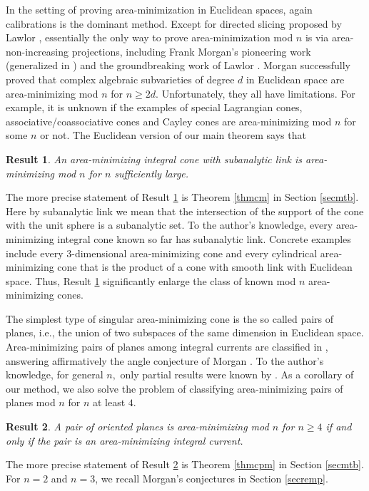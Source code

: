 \documentclass[11pt,a4paper]{amsart}
\numberwithin{equation}{section}
\theoremstyle{plain}
\newtheorem{rst}{Result}
\theoremstyle{definition}
\numberwithin{equation}{subsection}
\begin{document}
In the setting of proving area-minimization in Euclidean spaces, again calibrations is the dominant method. Except for directed slicing proposed by Lawlor \cite{GLds,GLsac}, essentially the only way to prove area-minimization mod $n$ is via area-non-increasing projections, including Frank Morgan's pioneering work \cite{FMcalv} (generalized in \cite[Lemma 2.11]{ZLa}) and the groundbreaking work of Lawlor \cite{GL}. Morgan \cite{FMcalv} successfully proved that complex algebraic subvarieties of degree $d$ in Euclidean space are area-minimizing mod $n$ for $n\ge 2d.$  Unfortunately, they all have limitations. For example, it is unknown \cite[Proposition 5.6]{FMcalv} if the examples \cite{HL} of special Lagrangian \cite{MHsc,MHsc2,DJsl,YZsmp,RBssl} cones, associative/coassociative \cite{RBas} cones and Cayley \cite{JLa,JL2r} cones are area-minimizing mod $n$ for some $n$ or not. The Euclidean version of our main theorem says that
\begin{rst}\label{rstc}
	An area-minimizing integral cone with subanalytic link is area-minimizing mod $n$ for $n$ sufficiently large.
\end{rst}		
The more precise statement of Result \ref{rstc} is Theorem \ref{thmcm} in Section \ref{secmtb}. Here by subanalytic link we mean that the intersection of the support of the cone with the unit sphere is a subanalytic set. To the author's knowledge, every area-minimizing integral cone known so far has subanalytic link. Concrete examples include every $3$-dimensional area-minimizing cone \cite{DSS1,DSS2,DSS3} and every cylindrical area-minimizing cone that is the product of a cone with smooth link with Euclidean space. Thus, Result \ref{rstc}  significantly enlarge the class of known mod $n$ area-minimizing cones.

The simplest type of singular area-minimizing cone is the so called pairs of planes, i.e., the union of two subspaces of the same dimension in Euclidean space. Area-minimizing pairs of planes among integral currents are classified in \cite{GLac,DN}, answering affirmatively the angle conjecture of Morgan \cite{FMtd}. To the author's knowledge, for general $n,$ only partial results were known by \cite{FMcalv,GL}. As a corollary of our method, we also solve the problem of classifying area-minimizing pairs of planes mod $n$ for $n$ at least $4.$
\begin{rst}\label{rstcp}
	A pair of oriented planes is area-minimizing mod $n$ for $n\ge 4$ if and only if the pair is an area-minimizing integral current. 
\end{rst}
The more precise statement of Result \ref{rstcp} is Theorem \ref{thmcpm} in Section \ref{secmtb}. For $n=2$ and $n=3$, we recall Morgan's conjectures \cite[Problem 16]{FMwtc} in Section \ref{secremp}.
\end{document}
